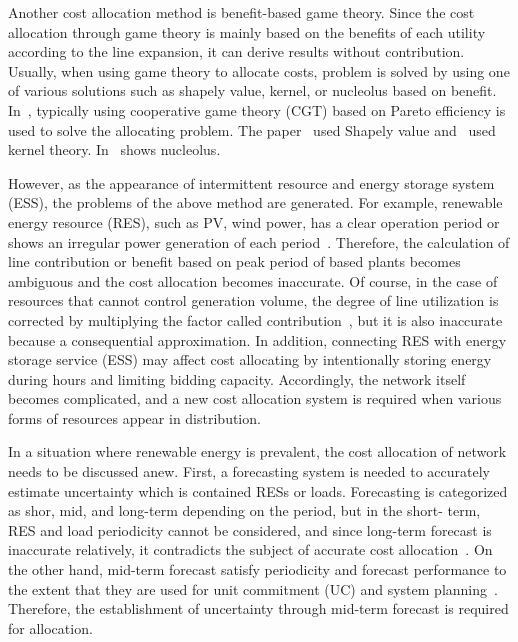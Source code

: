 \documentclass[journal]{IEEEtran} %
\begin{document}
Another cost allocation method is benefit-based game theory. Since the cost allocation through game theory is mainly based on the benefits of each utility according to the line expansion, it can derive results without contribution. Usually, when using game theory to allocate costs, problem is solved by using one of various solutions such as shapely value, kernel, or nucleolus based on benefit. In~\cite{tsukamoto1996allocation}, typically using cooperative game theory (CGT) based on Pareto efficiency is used to solve the allocating problem. The paper~\cite{ruiz2007effective} used Shapely value and~\cite{evans2003cost} used kernel theory. In~\cite{Zolezzi2002, erli2005transmission} shows nucleolus.

However, as the appearance of intermittent resource and energy storage system (ESS), the problems of the above method are generated. For example, renewable energy resource (RES), such as PV, wind power, has a clear operation period or shows an irregular power generation of each period~\cite{edwards2009energy}. Therefore, the calculation of line contribution or benefit based on peak period of based plants becomes ambiguous and the cost allocation becomes inaccurate. Of course, in the case of resources that cannot control generation volume, the degree of line utilization is corrected by multiplying the factor called contribution~\cite{chung2005transmission}, but it is also inaccurate because a consequential approximation. In addition, connecting RES with energy storage service (ESS) may affect cost allocating by intentionally storing energy during hours and limiting bidding capacity. Accordingly, the network itself becomes complicated, and a new cost allocation system is required when various forms of resources appear in distribution.

In a situation where renewable energy is prevalent, the cost allocation of network needs to be discussed anew. First, a forecasting system is needed to accurately estimate uncertainty which is contained RESs or loads. Forecasting is categorized as shor, mid, and long-term depending on the period, but in the short- term, RES and load periodicity cannot be considered, and since long-term forecast is inaccurate relatively, it contradicts the subject of accurate cost allocation~\cite{Hong2014}. On the other hand, mid-term forecast satisfy periodicity and forecast performance to the extent that they are used for unit commitment (UC) and system planning~\cite{Burger2014}. Therefore, the establishment of uncertainty through mid-term forecast is required for allocation.
\end{document}
